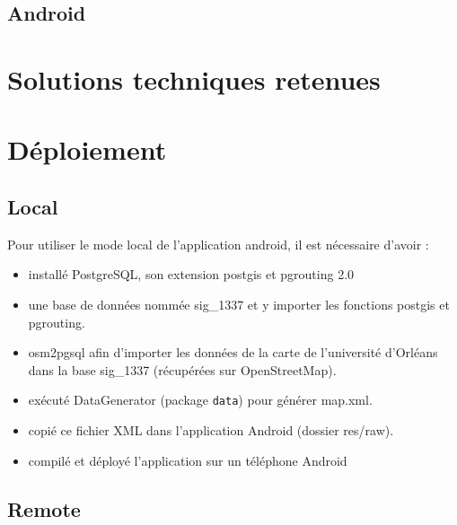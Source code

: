 \documentclass[12pt,a4paper,oneside]{article}
\begin{document}
\newpage

\subsection{Android}


\newpage

\section{Solutions techniques retenues}









\newpage

\section{Déploiement}

\subsection{Local}

Pour utiliser le mode local de l'application android, il est nécessaire d'avoir :
\begin{itemize}
\item installé PostgreSQL, son extension postgis et pgrouting 2.0
\item une base de données nommée sig\_1337 et y importer les fonctions postgis et pgrouting.
\item osm2pgsql afin d'importer les données de la carte de l'université d'Orléans dans la base sig\_1337 (récupérées sur OpenStreetMap).
\item exécuté DataGenerator (package \texttt{data}) pour générer map.xml.
\item copié ce fichier XML dans l'application Android (dossier res/raw).
\item compilé et déployé l'application sur un téléphone Android  \\
\end{itemize}

\subsection{Remote}
\end{document}
